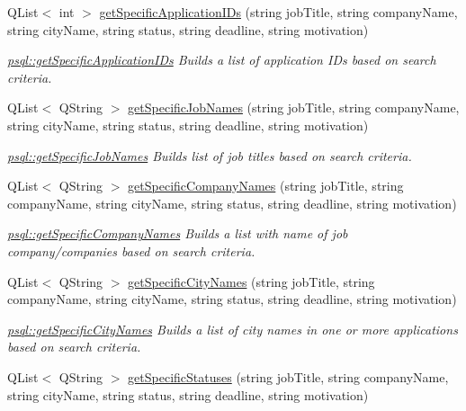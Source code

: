 \begin{DoxyCompactItemize}
Q\+List$<$ int $>$ \mbox{\hyperlink{classpsql_ab6edb8a2e42d8ac7c4ae29f5b0cb494f}{get\+Specific\+Application\+I\+Ds}} (string job\+Title, string company\+Name, string city\+Name, string status, string deadline, string motivation)
\begin{DoxyCompactList}\small\item\em \mbox{\hyperlink{classpsql_ab6edb8a2e42d8ac7c4ae29f5b0cb494f}{psql\+::get\+Specific\+Application\+I\+Ds}} Builds a list of application I\+Ds based on search criteria. \end{DoxyCompactList}\item 
Q\+List$<$ Q\+String $>$ \mbox{\hyperlink{classpsql_a029f2ef38c4156cc6c67765900c8245f}{get\+Specific\+Job\+Names}} (string job\+Title, string company\+Name, string city\+Name, string status, string deadline, string motivation)
\begin{DoxyCompactList}\small\item\em \mbox{\hyperlink{classpsql_a029f2ef38c4156cc6c67765900c8245f}{psql\+::get\+Specific\+Job\+Names}} Builds list of job titles based on search criteria. \end{DoxyCompactList}\item 
Q\+List$<$ Q\+String $>$ \mbox{\hyperlink{classpsql_ac2528de5054ba99371d2d796ed32b2b1}{get\+Specific\+Company\+Names}} (string job\+Title, string company\+Name, string city\+Name, string status, string deadline, string motivation)
\begin{DoxyCompactList}\small\item\em \mbox{\hyperlink{classpsql_ac2528de5054ba99371d2d796ed32b2b1}{psql\+::get\+Specific\+Company\+Names}} Builds a list with name of job company/companies based on search criteria. \end{DoxyCompactList}\item 
Q\+List$<$ Q\+String $>$ \mbox{\hyperlink{classpsql_aace910a1e695138795d6e41765908784}{get\+Specific\+City\+Names}} (string job\+Title, string company\+Name, string city\+Name, string status, string deadline, string motivation)
\begin{DoxyCompactList}\small\item\em \mbox{\hyperlink{classpsql_aace910a1e695138795d6e41765908784}{psql\+::get\+Specific\+City\+Names}} Builds a list of city names in one or more applications based on search criteria. \end{DoxyCompactList}\item 
Q\+List$<$ Q\+String $>$ \mbox{\hyperlink{classpsql_aa04154eae71d7cdfd0fb8ab67ac032e7}{get\+Specific\+Statuses}} (string job\+Title, string company\+Name, string city\+Name, string status, string deadline, string motivation)

\end{DoxyCompactItemize}

